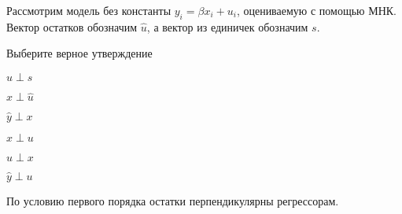
\begin{question}
Рассмотрим модель без константы \(y_i = \beta x_i + u_i\), оцениваемую с помощью МНК.
Вектор остатков обозначим \(\hat u\), а вектор из единичек обозначим \(s\).

Выберите верное утверждение
\begin{answerlist}
  \item \(\hat u \perp s\)
  \item \(\hat x \perp \hat u\)
  \item \(\hat y \perp x\)
  \item \(x \perp u\)
  \item \(\hat u \perp x\)
  \item \(\hat y \perp u\)
\end{answerlist}
\end{question}

\begin{solution}
По условию первого порядка остатки перпендикулярны регрессорам.
\end{solution}

